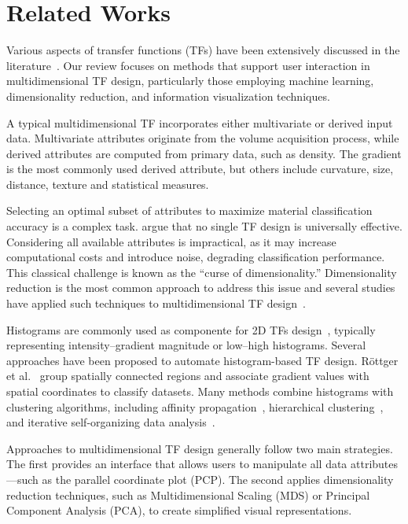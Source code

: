 \section{Related Works}
\label{sect:related-works}

Various aspects of transfer functions (TFs) have been extensively discussed in the literature~\cite{ljung2016}. Our review focuses on methods that support user interaction in multidimensional TF design, particularly those employing machine learning, dimensionality reduction, and information visualization techniques.

A typical multidimensional TF incorporates either multivariate or derived input data. Multivariate attributes originate from the volume acquisition process, while derived attributes are computed from primary data, such as density. The gradient is the most commonly used derived attribute, but others include curvature, size, distance, texture and statistical measures.

Selecting an optimal subset of attributes to maximize material classification accuracy is a complex task. \cite{arens2010} argue that no single TF design is universally effective. Considering all available attributes is impractical, as it may increase computational costs and introduce noise, degrading classification performance. This classical challenge is known as the ``curse of dimensionality.'' Dimensionality reduction is the most common approach to address this issue and several studies have applied such techniques to multidimensional TF design~\cite{cai2017, abbasloo2016, gao2022, moura2007, zhao2010}.

Histograms are commonly used as  componente for 2D TFs design~\cite{kniss2002}, typically representing intensity–gradient magnitude or low–high histograms. Several approaches have been proposed to automate histogram-based TF design. Röttger et al.~\cite{roettger2005} group spatially connected regions and associate gradient values with spatial coordinates to classify datasets. Many methods combine histograms with clustering algorithms, including affinity propagation~\cite{zhang2016}, hierarchical clustering~\cite{sereda2006}, and iterative self-organizing data analysis~\cite{tzeng2004}.

Approaches to multidimensional TF design generally follow two main strategies. The first provides an interface that allows users to manipulate all data attributes—such as the parallel coordinate plot (PCP). The second applies dimensionality reduction techniques, such as Multidimensional Scaling (MDS) or Principal Component Analysis (PCA), to create simplified visual representations.

